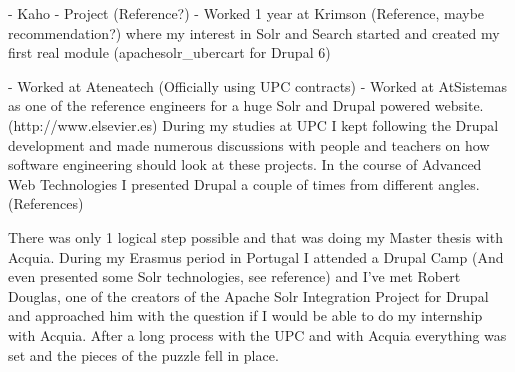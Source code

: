 - Kaho
- Project (Reference?)
- Worked 1 year at Krimson (Reference, maybe recommendation?) where my interest in Solr and Search started and created my first real module (apachesolr\_ubercart for Drupal 6)

- Worked at Ateneatech (Officially using UPC contracts)
- Worked at AtSistemas as one of the reference engineers for a huge Solr and Drupal powered website. (http://www.elsevier.es)
During my studies at UPC I kept following the Drupal development and made numerous discussions with people and teachers on how software engineering should look at these projects. In the course of Advanced Web Technologies I presented Drupal a couple of times from different angles. (References)

There was only 1 logical step possible and that was doing my Master thesis with Acquia. During my Erasmus period in Portugal I attended a Drupal Camp (And even presented some Solr technologies, see reference) and I've met Robert Douglas, one of the creators of the Apache Solr Integration Project for Drupal and approached him with the question if I would be able to do my internship with Acquia. After a long process with the UPC and with Acquia everything was set and the pieces of the puzzle fell in place.